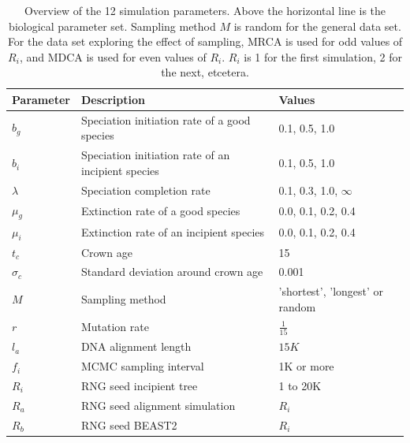 \documentclass{article}
\begin{document}
\begin{table}
  \centering 
  \begin{tabular}{l l l}
    \hline
    Parameter             & Description & Values \\
    \hline
    \hline
    $b_g$                 & Speciation initiation rate of a good species & 0.1, 0.5, 1.0 \\
    $b_i$                 & Speciation initiation rate of an incipient species & 0.1, 0.5, 1.0 \\
    $\lambda$             & Speciation completion rate & 0.1, 0.3, 1.0, $\infty$ \\
    $\mu_g$               & Extinction rate of a good species & 0.0, 0.1, 0.2, 0.4 \\
    $\mu_i$               & Extinction rate of an incipient species & 0.0, 0.1, 0.2, 0.4 \\
    \hline
    $t_c$                 & Crown age & 15 \\
    $\sigma_c$            & Standard deviation around crown age & 0.001 \\
    $M$                   & Sampling method & 'shortest', 'longest' or random \\
    $r$                   & Mutation rate & $\frac{1}{15}$ \\
    $l_a$                 & DNA alignment length & $15K$ \\
    $f_i$                 & MCMC sampling interval & 1K or more \\
    $R_i$                 & RNG seed incipient tree & 1 to 20K \\
    $R_a$                 & RNG seed alignment simulation & $R_i$ \\
    $R_b$                 & RNG seed BEAST2 & $R_i$ \\
    \hline
  \end{tabular}
  \caption{
    Overview of the 12 simulation parameters. Above the horizontal line is 
    the biological parameter set. Sampling method $M$ is random for the general
    data set. For the data set exploring the effect of sampling, MRCA is
    used for odd values of $R_i$, and MDCA is used for even values of $R_i$.
    $R_i$ is 1 for the first simulation, 2 for the next, etcetera.
  }
  \label{table:parameters}
\end{table}
\end{document}
